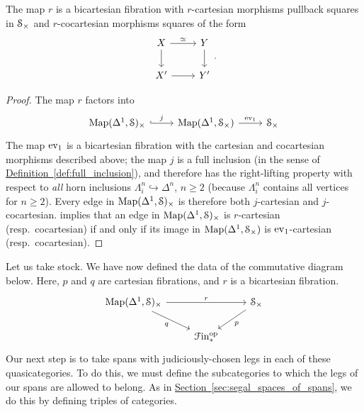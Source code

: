 \documentclass[main.tex]{subfiles}
\begin{document}
\begin{lemma}
  \label{lemma:map_on_cartesian_cats_is_bicart_fib}
  The map $r$ is a bicartesian fibration with $r$-cartesian morphisms pullback squares in $\S_{\times}$ and $r$-cocartesian morphisms squares of the form
  \begin{equation*}
    \begin{tikzcd}
      X
      \arrow[r, "\simeq"]
      \arrow[d]
      & Y
      \arrow[d]
      \\
      X'
      \arrow[r]
      & Y'
    \end{tikzcd}.
  \end{equation*}
\end{lemma}
\begin{proof}
  The map $r$ factors into
  \begin{equation*}
    \begin{tikzcd}
      \Map(\Delta^{1}, \S)_{\times}
      \arrow[r, hook, "j"]
      & \Map(\Delta^{1}, \S_{\times})
      \arrow[r, "\ev_{1}"]
      & \S_{\times}
    \end{tikzcd}
  \end{equation*}
  The map $\ev_{1}$ is a bicartesian fibration with the cartesian and cocartesian morphisms described above; the map $j$ is a full inclusion (in the sense of \hyperref[def:full_inclusion]{Definition~\ref*{def:full_inclusion}}), and therefore has the right-lifting property with respect to \emph{all} horn inclusions $\Lambda^{n}_{i} \hookrightarrow \Delta^{n}$, $n \geq 2$ (because $\Lambda^{n}_{i}$ contains all vertices for $n \geq 2$). Every edge in $\Map(\Delta^{1}, \S)_{\times}$ is therefore both $j$-cartesian and $j$-cocartesian. \cite[Prop\ 2.4.1.3.3]{highertopostheory} implies that an edge in $\Map(\Delta^{1}, \S)_{\times}$ is $r$-cartesian (resp.\ cocartesian) if and only if its image in $\Map(\Delta^{1}, \S_{\times})$ is $\ev_{1}$-cartesian (resp.\ cocartesian).
\end{proof}

Let us take stock. We have now defined the data of the commutative diagram below. Here, $p$ and $q$ are cartesian fibrations, and $r$ is a bicartesian fibration.
\begin{equation*}
  \begin{tikzcd}
    \Map(\Delta^{1}, \S)_{\times}
    \arrow[rr, "r"]
    \arrow[dr, swap, "q"]
    && \S_{\times}
    \arrow[dl, "p"]
    \\
    & \Finp\op
  \end{tikzcd}
\end{equation*}
Our next step is to take spans with judiciously-chosen legs in each of these quasicategories. To do this, we must define the subcategories to which the legs of our spans are allowed to belong. As in \hyperref[sec:segal_spaces_of_spans]{Section~\ref*{sec:segal_spaces_of_spans}}, we do this by defining triples of categories.
\end{document}
